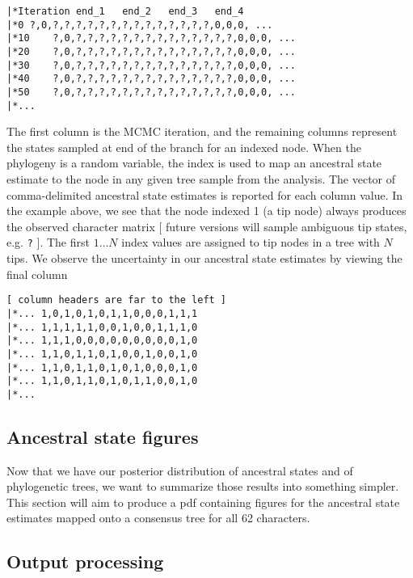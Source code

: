 {\tt \begin{snugshade*}
\begin{lstlisting}
|*Iteration	end_1	end_2	end_3	end_4
|*0	?,0,?,?,?,?,?,?,?,?,?,?,?,?,?,?,0,0,0, ...
|*10	?,0,?,?,?,?,?,?,?,?,?,?,?,?,?,?,0,0,0, ...
|*20	?,0,?,?,?,?,?,?,?,?,?,?,?,?,?,?,0,0,0, ...
|*30	?,0,?,?,?,?,?,?,?,?,?,?,?,?,?,?,0,0,0, ...
|*40	?,0,?,?,?,?,?,?,?,?,?,?,?,?,?,?,0,0,0, ...
|*50	?,0,?,?,?,?,?,?,?,?,?,?,?,?,?,?,0,0,0, ...
|*...
\end{lstlisting}
\end{snugshade*}}

The first column is the MCMC iteration, and the remaining columns represent the states sampled at end of the branch for an indexed node.
When the phylogeny is a random variable, the index is used to map an ancestral state estimate to the node in any given tree sample from the analysis.
The vector of comma-delimited ancestral state estimates is reported for each column value.
In the example above, we see that the node indexed 1 (a tip node) always produces the observed character matrix [ future versions will sample ambiguous tip states, e.g. {\tt ?} ].
The first $1 \ldots N$ index values are assigned to tip nodes in a tree with $N$ tips.
We observe the uncertainty in our ancestral state estimates by viewing the final column

{\tt \begin{snugshade*}
\begin{lstlisting}
[ column headers are far to the left ]
|*... 1,0,1,0,1,0,1,1,0,0,0,1,1,1
|*... 1,1,1,1,1,0,0,1,0,0,1,1,1,0
|*... 1,1,1,0,0,0,0,0,0,0,0,0,1,0
|*... 1,1,0,1,1,0,1,0,0,1,0,0,1,0
|*... 1,1,0,1,1,0,1,0,1,0,0,0,1,0
|*... 1,1,0,1,1,0,1,0,1,1,0,0,1,0
|*...
\end{lstlisting}
\end{snugshade*}}

\subsection{Ancestral state figures}

Now that we have our posterior distribution of ancestral states and of phylogenetic trees, we want to summarize those results into something simpler.
This section will aim to produce a pdf containing figures for the ancestral state estimates mapped onto a consensus tree for all 62 characters.

\subsection{Output processing}


